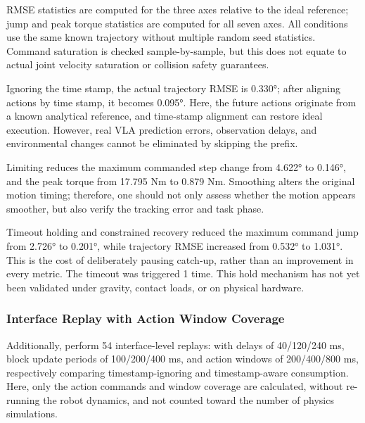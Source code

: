 RMSE statistics are computed for the three axes relative to the ideal reference; jump and peak torque statistics are computed for all seven axes. All conditions use the same known trajectory without multiple random seed statistics. Command saturation is checked sample-by-sample, but this does not equate to actual joint velocity saturation or collision safety guarantees.


Ignoring the time stamp, the actual trajectory RMSE is 0.330°; after aligning actions by time stamp, it becomes 0.095°. Here, the future actions originate from a known analytical reference, and time-stamp alignment can restore ideal execution. However, real VLA prediction errors, observation delays, and environmental changes cannot be eliminated by skipping the prefix.


Limiting reduces the maximum commanded step change from 4.622° to 0.146°, and the peak torque from 17.795 Nm to 0.879 Nm. Smoothing alters the original motion timing; therefore, one should not only assess whether the motion appears smoother, but also verify the tracking error and task phase.


Timeout holding and constrained recovery reduced the maximum command jump from 2.726° to 0.201°, while trajectory RMSE increased from 0.532° to 1.031°. This is the cost of deliberately pausing catch-up, rather than an improvement in every metric. The timeout was triggered 1 time. This hold mechanism has not yet been validated under gravity, contact loads, or on physical hardware.

\subsubsection{Interface Replay with Action Window Coverage}\label{s16-detail-2}

Additionally, perform 54 interface-level replays: with delays of 40/120/240 ms, block update periods of 100/200/400 ms, and action windows of 200/400/800 ms, respectively comparing timestamp-ignoring and timestamp-aware consumption. Here, only the action commands and window coverage are calculated, without re-running the robot dynamics, and not counted toward the number of physics simulations.

